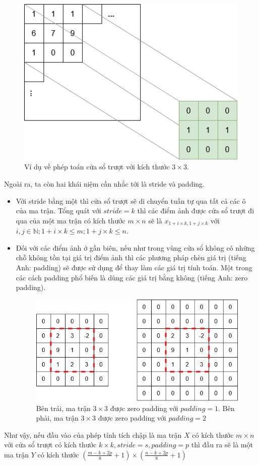\begin{figure}[ht!]
	\centerline{\includegraphics[scale=0.6]{images/sliding_window.png}}
  	\caption{Ví dụ về phép toán cửa sổ trượt với kích thước $3 \times 3$.}
  	\label{fig:sliding_window}
\end{figure}
Ngoài ra, ta còn hai khái niệm cần nhắc tới là stride và padding. 
\begin{itemize}
	\item Với stride bằng một thì cửa sổ trượt sẽ di chuyển tuần tự qua tất cả các ô của ma trận. Tổng quát với $stride = k$ thì các điểm ảnh được cửa sổ trượt đi qua của một ma trận có kích thước $m {\times} n$ sẽ là $x_{1+i {\times} k,1+j {\times} k}$ với $i,j \in \mathbb{N}; 1+i \times k \leq m; 1+j \times k \leq n$.
	\item Đối với các điểm ảnh ở gần biên, nếu như trong vùng cửa sổ không có những chỗ không tồn tại giá trị điểm ảnh thì các phương pháp chèn giá trị (tiếng Anh: padding) sẽ được sử dụng để thay làm các giá trị tính toán. Một trong các cách padding phổ biến là dùng các giá trị bằng không (tiếng Anh: zero padding).
\begin{figure}[ht!]
	\centerline{\includegraphics[scale=0.6]{images/padding.png}}
  	\caption{Bên trái, ma trận $3 \times 3$ được zero padding với $padding=1$. Bên phải, ma trận $3 \times 3$ được zero padding với $padding=2$}
  	\label{fig:padding}
\end{figure}
\end{itemize}
Như vậy, nếu đầu vào của phép tính tích chập là ma trận $X$ có kích thước $m \times n$ với cửa sổ trượt có kích thước $k \times k, stride=s, padding=p$ thì đầu ra sẽ là một ma trận $Y$ có kích thước 
$\left( 
	\frac
		{{m-k+2p}}
		{8}
	+1
\right)
\times
\left( 
	\frac
		{{n-k+2p}}
		{8}
	+1
\right)$

